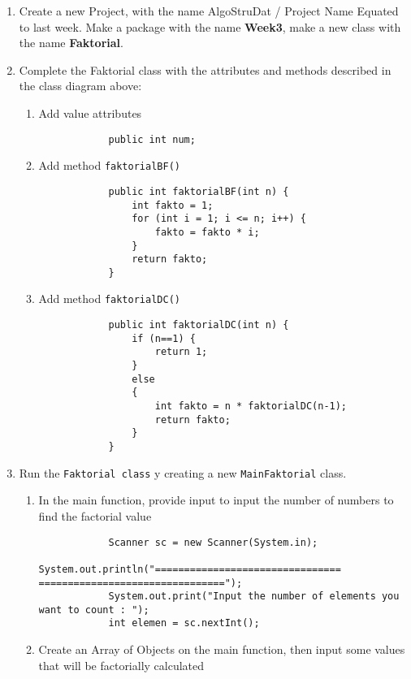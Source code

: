 \documentclass[12pt,titlepage]{article}
\begin{document}
\begin{enumerate}
    \item Create a new Project, with the name AlgoStruDat / Project Name Equated to last week. Make a package with the name \textbf{Week3}, make a new class with the name \textbf{Faktorial}.
    \item Complete the Faktorial class with the attributes and methods described in the class diagram above:
    \begin{enumerate}
        \item Add value attributes
        \begin{verbatim}
            public int num;
        \end{verbatim}
        \item Add method \texttt{faktorialBF()}
        \begin{verbatim}
            public int faktorialBF(int n) {
                int fakto = 1;
                for (int i = 1; i <= n; i++) {
                    fakto = fakto * i;
                }
                return fakto;
            }
        \end{verbatim}
        \item Add method \texttt{faktorialDC()}
        \begin{verbatim}
            public int faktorialDC(int n) {
                if (n==1) {
                    return 1;
                }
                else
                {
                    int fakto = n * faktorialDC(n-1);
                    return fakto;
                }
            }
        \end{verbatim}
    \end{enumerate}
    \item Run the \texttt{Faktorial class} y creating a new \texttt{MainFaktorial} class.
    \begin{enumerate}
        \item In the main function, provide input to input the number of numbers to find the factorial value
        \begin{verbatim}
            Scanner sc = new Scanner(System.in);
            System.out.println("================================ ================================");
            System.out.print("Input the number of elements you want to count : ");
            int elemen = sc.nextInt();
        \end{verbatim}
        \item Create an Array of Objects on the main function, then input some values that will be factorially calculated

\end{enumerate}
\end{enumerate}
\end{document}
